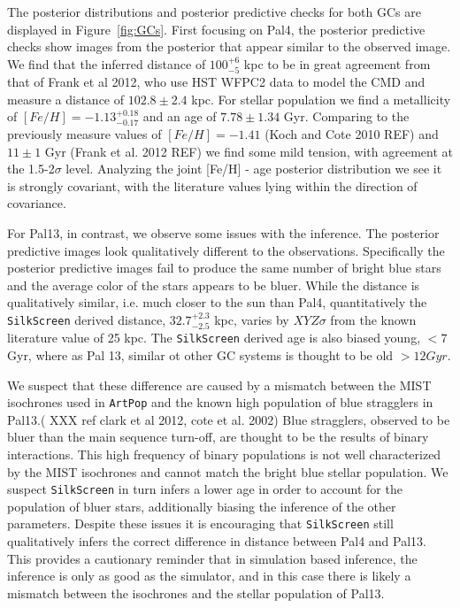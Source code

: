 \documentclass[twocolumn]{aastex631}
\newcommand{\code}[0]{\texttt{SilkScreen}}
\newcommand{\artpop}[0]{\texttt{ArtPop}}
\begin{document}
The posterior distributions and posterior predictive checks for both GCs are displayed in Figure~\ref{fig:GCs}. First focusing on Pal4, the posterior predictive checks show images from the posterior that appear similar to the observed image. We find that the inferred distance of $100^{+6}_{-5}$ kpc to be in great agreement from that of Frank et al 2012, who use HST WFPC2 data to model the CMD and measure a distance of $102.8 \pm 2.4$ kpc. For stellar population we find a metallicity of $[Fe/H] = -1.13 ^{+0.18}_{-0.17}$ and an age of $7.78 \pm 1.34$ Gyr. Comparing to the previously measure values of $[Fe/H] = -1.41$ (Koch and Cote 2010 REF) and $11 \pm 1$ Gyr (Frank et al. 2012 REF) we find some mild tension, with agreement at the 1.5-2$\sigma$ level. Analyzing the joint [Fe/H] - age posterior distribution we see it is strongly covariant, with the literature values lying within the direction of covariance.

For Pal13, in contrast, we observe some issues with the inference. The posterior predictive images look qualitatively different to the observations. Specifically the posterior predictive images fail to produce the same number of bright blue stars and the average color of the stars appears to be bluer. While the distance is qualitatively similar, i.e. much closer to the sun than Pal4, quantitatively the \code{} derived distance, $32.7^{+2.3}_{-2.5}$ kpc, varies by $XYZ \sigma$ from the known literature value of 25 kpc. The \code{} derived age is also biased young, $< 7$ Gyr, where as Pal 13, similar ot other GC systems is thought to be old $>12 Gyr$.

We suspect that these difference are caused by a mismatch between the MIST isochrones used in \artpop{} and the known high population of blue stragglers in Pal13.( XXX ref clark et al 2012, cote et al. 2002) Blue stragglers, observed to be bluer than the main sequence turn-off, are thought to be the results of binary interactions. This high frequency of binary populations is not well characterized by the MIST isochrones and cannot match the bright blue stellar population. We suspect \code{} in turn infers a lower age in order to account for the population of bluer stars, additionally biasing the inference of the other parameters. Despite these issues it is encouraging that \code{} still qualitatively infers the correct difference in distance between Pal4 and Pal13. This provides a cautionary reminder that in simulation based inference, the inference is only as good as the simulator, and in this case there is likely a mismatch between the isochrones and the stellar population of Pal13.
\end{document}
